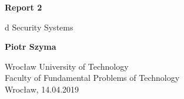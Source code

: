 \begin{titlepage}
  \begin{center}
      \vspace*{1cm}

      \textbf{Report 2}

      \vspace{0.5cm}
       d Security Systems

      \vspace{1.5cm}

      \textbf{Piotr Szyma}

      \vfill

      \vspace{0.8cm}

      Wrocław University of Technology\\
      Faculty of Fundamental Problems of Technology\\
      Wrocław, 14.04.2019

  \end{center}
\end{titlepage}